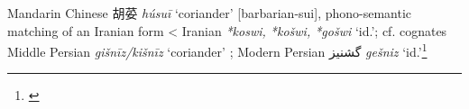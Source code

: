 \begin{etymology}\label{ety:husui}
Mandarin Chinese {胡荽} \textit{húsuī} `coriander' [barbarian-sui], phono-semantic matching of an Iranian form
< Iranian \textit{*koswi, *košwi, *gošwi} `id.'; cf. cognates Middle Persian \textit{gišnīz/kišnīz} `coriander'  ; Modern Persian گشنیز \textit{gešniz} `id.'\footnote{\textcite{laufer_sino-iranica_1919}}
\end{etymology}